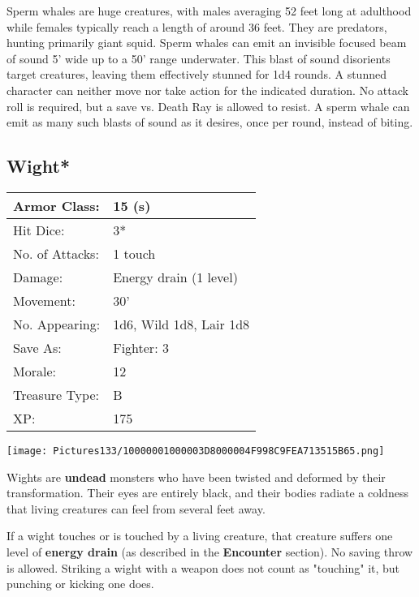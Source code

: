 \documentclass[a4paper,twoside,openany,10pt]{book}
\begin{document}
\begin{multicols}{2}
Sperm whales are huge creatures, with males averaging 52 feet long at adulthood while females typically reach a length of around 36 feet. They are predators, hunting primarily giant squid. Sperm whales can emit an invisible focused beam of sound 5'  wide up to a 50' range underwater. This blast of sound disorients target creatures, leaving them effectively stunned for 1d4 rounds. A stunned character can neither move nor take action for the indicated duration. No attack roll is required, but a save vs. Death Ray is allowed to resist. A sperm whale can emit as many such blasts of sound  as it desires, once per round, instead of biting.

\subsection*{Wight*}\label{wight}

\begin{tabularx}{0.50\textwidth}{@{}lX@{}}
Armor Class: & 15 (s) \\\hline
Hit Dice: & 3* \\\hline
No. of Attacks: & 1 touch \\\hline
Damage: & Energy drain (1 level) \\\hline
Movement: & 30' \\\hline
No. Appearing: & 1d6, Wild 1d8, Lair 1d8 \\\hline
Save As: & Fighter: 3 \\\hline
Morale: & 12 \\\hline
Treasure Type: & B \\\hline
XP: & 175 \\\hline
\end{tabularx}\medskip


\begin{center} \texttt{[image: Pictures133/10000001000003D8000004F998C9FEA713515B65.png]} \end{center}

Wights are \textbf{undead }monsters who have been twisted and deformed by their transformation. Their eyes are entirely black, and their bodies radiate a coldness that living creatures can feel from several feet away. 

If a wight touches or is touched by a living creature, that creature suffers one level of \textbf{energy drain} (as described in the \textbf{Encounter} section). No saving throw is allowed. Striking a wight with a weapon does not count as "touching" it, but punching or kicking one does.


\end{multicols}
\end{document}
